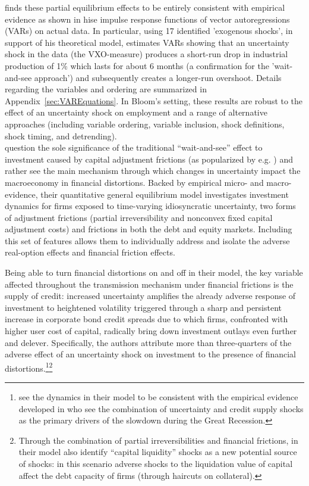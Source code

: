 \documentclass[a4paper,11pt,listof=nochaptergap,oneside,pointednumbers,bibtotoc,bigheadings,liststotoc,hidelinks]{scrbook}
\theoremstyle{mysatz}
\theoremstyle{mydefinition}
\theoremstyle{mytheorem}
\theoremstyle{mybemerkung}
\begin{document}
\citet{bloom:09} finds these partial equilibrium effects to be entirely consistent with empirical evidence as shown in hise impulse response functions of vector autoregressions (VARs) on actual data. In particular, using 17 identified 'exogenous shocks', in support of his theoretical model, \citet{bloom:09} estimates VARs showing that an uncertainty shock in the data (the VXO-measure) produces a short-run drop in industrial production of 1\% which lasts for about 6 months (a confirmation for the ’wait-and-see approach’) and subsequently creates a longer-run overshoot. Details regarding the variables and ordering are summarized in Appendix~\ref{sec:VAREquations}. In Bloom's setting, these results are robust to the effect of an uncertainty shock on employment and a range of alternative approaches (including variable ordering, variable inclusion, shock definitions, shock timing, and detrending). \\


\citet{gilchristetal:14} question the sole significance of the traditional ``wait-and-see'' effect to investment caused by capital adjustment frictions (as popularized by e.g. \citealp{bloom:09}) and rather see the main mechanism through which changes in uncertainty impact the macroeconomy in financial distortions. Backed by empirical micro- and macro-evidence, their quantitative general equilibrium model investigates investment dynamics for firms exposed to time-varying idiosyncratic uncertainty, two forms of adjustment frictions (partial irreversibility and nonconvex fixed capital adjustment costs) and frictions in both the debt and equity markets. Including this set of features allows them to individually address and isolate the adverse real-option effects and financial friction effects. 

Being able to turn financial distortions on and off in their model, the key variable affected throughout the transmission mechanism under financial frictions is the supply of credit: increased uncertainty amplifies the already adverse response of investment to heightened volatility triggered through a sharp and persistent increase in corporate bond credit spreads due to which firms, confronted with higher user cost of capital, radically bring down investment outlays even further and delever. Specifically, the authors attribute more than three-quarters of the adverse effect of an uncertainty shock on investment to the presence of financial distortions.\footnote{\citet{gilchristetal:14} see the dynamics in their model to be consistent with the empirical evidence developed in \citet{stockandwatson:12} who see the combination of uncertainty and credit supply shocks as the primary drivers of the slowdown during the Great Recession.}\footnote{Through the combination of partial irreversibilities and financial frictions, in their model \citet{gilchristetal:14} also identify ``capital liquidity'' shocks as a new potential source of shocks: in this scenario adverse shocks to the liquidation value of capital affect the debt capacity of firms (through haircuts on collateral).}
\end{document}

